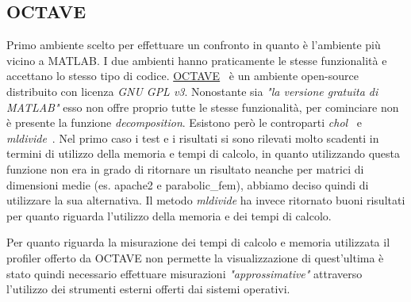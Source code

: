 \documentclass[a4paper,12pt,titlepage,oneside]{book}
\begin{document}
        \subsection{OCTAVE}
        \noindent Primo ambiente scelto per effettuare un confronto in quanto è l'ambiente più vicino a MATLAB. I due ambienti hanno praticamente le stesse funzionalità e accettano lo stesso tipo di codice. \href{https://www.gnu.org/software/octave/}{OCTAVE}~\cite{octave} è un ambiente open-source distribuito con licenza \textit{GNU GPL v3}.
        Nonostante sia \textit{"la versione gratuita di MATLAB"} esso non offre proprio tutte le stesse funzionalità, per cominciare non è presente la funzione \textit{decomposition}. Esistono però le controparti \textit{chol}~\cite{choloctave} e \textit{mldivide}~\cite{mldivideoctave}. Nel primo caso i test e i risultati si sono rilevati molto scadenti in termini di utilizzo della memoria e tempi di calcolo, in quanto utilizzando questa funzione non era in grado di ritornare un risultato neanche per matrici di dimensioni medie (es. apache2 e parabolic\_fem), abbiamo deciso quindi di utilizzare la sua alternativa. Il metodo \textit{mldivide} ha invece ritornato buoni risultati per quanto riguarda l'utilizzo della memoria e dei tempi di calcolo.\\[0.5cm]
        
        
        
        \vspace{0.5cm}
        
        \noindent Per quanto riguarda la misurazione dei tempi di calcolo e memoria  utilizzata il profiler offerto da OCTAVE non permette la visualizzazione di quest'ultima è stato quindi necessario effettuare misurazioni \textit{"approssimative"} attraverso l'utilizzo dei strumenti esterni offerti dai sistemi operativi.
        
        \newpage
\end{document}
